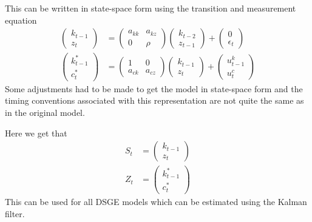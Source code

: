 \documentclass{beamer}
\begin{document}
\begin{frame}
  This can be written in state-space form using the transition and measurement equation
\begin{align}
  \begin{pmatrix} k_{t-1} \\ z_t  \end{pmatrix} &= 
  \begin{pmatrix} a_{kk} & a_{kz} \\ 0 & \rho \end{pmatrix}
  \begin{pmatrix} k_{t-2} \\ z_{t-1} \end{pmatrix} +
  \begin{pmatrix} 0 \\ \epsilon_t \end{pmatrix}\\
  \begin{pmatrix} k^*_{t-1} \\ c^*_t \end{pmatrix} &=
  \begin{pmatrix} 1 & 0 \\ a_{ck} & a_{cz}  \end{pmatrix}
  \begin{pmatrix} k_{t-1} \\ z_t \end{pmatrix} +
  \begin{pmatrix} u^k_{t-1} \\ u^c_t \end{pmatrix}
\end{align}
Some adjustments had to be made to get the model in state-space form and the timing conventions associated with this representation are not quite the same as in the original model.

\end{frame}

\begin{frame}
  Here we get that
\begin{align}
  S_t &= \begin{pmatrix} k_{t-1} \\ z_t  \end{pmatrix}\\
  Z_t &= \begin{pmatrix} k^*_{t-1} \\ c^*_t \end{pmatrix}
\end{align}
This can be used for all DSGE models which can be estimated using the Kalman filter. 
\end{frame}
\end{document}
